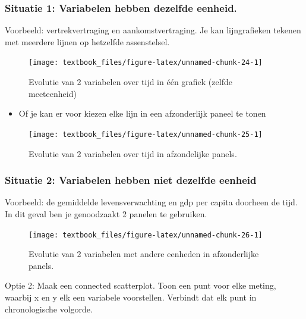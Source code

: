 \documentclass[]{tufte-book}
\providecommand{\tightlist}{%
  \setlength{\itemsep}{0pt}\setlength{\parskip}{0pt}}
\begin{document}
\hypertarget{situatie-1-variabelen-hebben-dezelfde-eenheid.}{%
\subsubsection{Situatie 1: Variabelen hebben dezelfde eenheid.}\label{situatie-1-variabelen-hebben-dezelfde-eenheid.}}

Voorbeeld: vertrekvertraging en aankomstvertraging. Je kan lijngrafieken tekenen met meerdere lijnen op hetzelfde assenstelsel.

\begin{figure}
\texttt{[image: textbook\_files/figure-latex/unnamed-chunk-24-1]} \caption[Evolutie van 2 variabelen over tijd in één grafiek (zelfde meeteenheid)]{Evolutie van 2 variabelen over tijd in één grafiek (zelfde meeteenheid)}\label{fig:unnamed-chunk-24}
\end{figure}

\begin{itemize}
\tightlist
\item
  Of je kan er voor kiezen elke lijn in een afzonderlijk paneel te tonen
\end{itemize}

\begin{figure}
\texttt{[image: textbook\_files/figure-latex/unnamed-chunk-25-1]} \caption[Evolutie van 2 variabelen over tijd in afzondelijke panels]{Evolutie van 2 variabelen over tijd in afzondelijke panels.}\label{fig:unnamed-chunk-25}
\end{figure}

\hypertarget{situatie-2-variabelen-hebben-niet-dezelfde-eenheid}{%
\subsubsection{Situatie 2: Variabelen hebben niet dezelfde eenheid}\label{situatie-2-variabelen-hebben-niet-dezelfde-eenheid}}

Voorbeeld: de gemiddelde levensverwachting en gdp per capita doorheen de tijd. In dit geval ben je genoodzaakt 2 panelen te gebruiken.

\begin{figure}
\texttt{[image: textbook\_files/figure-latex/unnamed-chunk-26-1]} \caption[Evolutie van 2 variabelen met andere eenheden in afzonderlijke panels]{Evolutie van 2 variabelen met andere eenheden in afzonderlijke panels.}\label{fig:unnamed-chunk-26}
\end{figure}

Optie 2: Maak een connected scatterplot. Toon een punt voor elke meting, waarbij x en y elk een variabele voorstellen. Verbindt dat elk punt in chronologische volgorde.
\end{document}
